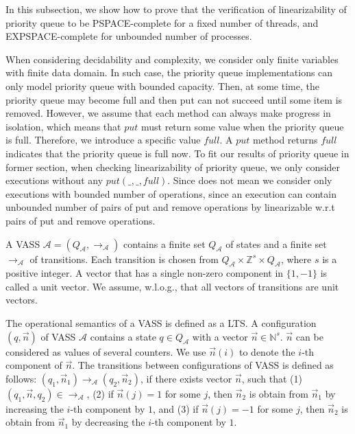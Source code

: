 In this subsection, we show how to prove that the verification of linearizability of priority queue to be PSPACE-complete for a fixed number of threads, and EXPSPACE-complete for unbounded number of processes.

When considering decidability and complexity, we consider only finite variables with finite data domain. In such case, the priority queue implementations can only model priority queue with bounded capacity. Then, at some time, the priority queue may become full and then put can not succeed until some item is removed. However, we assume that each method can always make progress in isolation, which means that $\textit{put}$ must return some value when the priority queue is full. Therefore, we introduce a specific value $\textit{full}$. A $\textit{put}$ method returns $\textit{full}$ indicates that the priority queue is full now. To fit our results of priority queue in former section, when checking linearizability of priority queue, we only consider executions without any $\textit{put}(\_,\_,\textit{full})$. Since does not mean we consider only executions with bounded number of operations, since an execution can contain unbounded number of pairs of put and remove operations by linearizable w.r.t pairs of put and remove operations.

 A VASS \cite{conf/esop/BouajjaniEEH13} $\mathcal{A}=(Q_\mathcal{A},\rightarrow_\mathcal{A})$ contains a finite set $Q_\mathcal{A}$ of states and a finite set $\rightarrow_\mathcal{A}$ of transitions. Each transition is chosen from $Q_\mathcal{A} \times \mathbb{Z}^s \times Q_\mathcal{A}$, where $s$ is a positive integer. A vector that has a single non-zero component in $\{1,-1\}$ is called a unit vector. We assume, w.l.o.g., that all vectors of transitions are unit vectors.

The operational semantics of a VASS is defined as a LTS. A configuration $(q,\vec n)$ of VASS $\mathcal{A}$ contains a state $q \in Q_\mathcal{A}$ with a vector $\vec n \in \mathbb{N}^s$. $\vec n$ can be considered as values of several counters. We use $\vec n(i)$ to denote the $i$-th component of $\vec n$. The transitions between configurations of VASS is defined as follows: $(q_1, \vec n_1) \rightarrow_{\mathcal{A}} (q_2, \vec n_2)$, if there exists vector $\vec n$, such that (1) $(q_1,\vec n,q_2) \in \rightarrow_\mathcal{A}$, (2) if $\vec n(j)=1$ for some $j$, then $\vec n_2$ is obtain from $\vec n_1$ by increasing the $i$-th component by $1$, and (3) if $\vec n(j)=-1$ for some $j$, then $\vec n_2$ is obtain from $\vec n_1$ by decreasing the $i$-th component by $1$.

